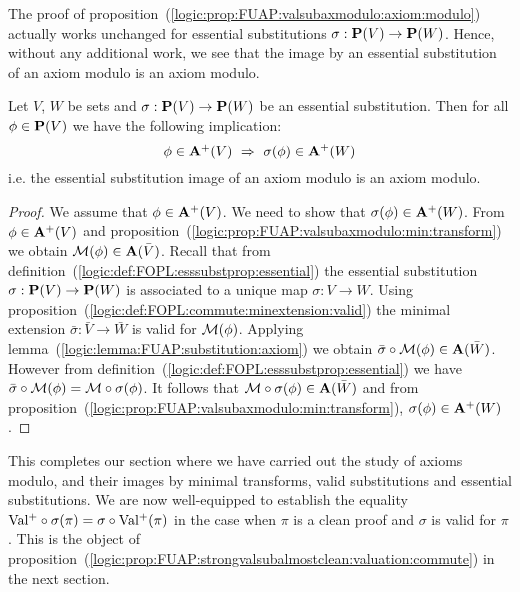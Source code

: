 The proof of
proposition~(\ref{logic:prop:FUAP:valsubaxmodulo:axiom:modulo})
actually works unchanged for essential substitutions
$\sigma:\mbox{${\bf P}(V)$}\to{\bf P}(W)$. Hence, without any additional work, we
see that the image by an essential substitution of an axiom modulo
is an axiom modulo.

\begin{prop}\label{logic:prop:FUAP:valsubaxmodulo:essential}
Let $V$, $W$ be sets and $\sigma:\mbox{${\bf P}(V)$}\to{\bf P}(W)$ be an essential
substitution. Then for all $\phi\in\mbox{${\bf P}(V)$}$ we have the following
implication:
    \[
    \phi\in\avs\ \Rightarrow\ \sigma(\phi)\in{\bf A}^{+}(W)
    \]
i.e. the essential substitution image of an axiom modulo is an axiom
modulo.
\end{prop}
\begin{proof}
We assume that $\phi\in\mbox{${\bf A}^{+}(V)$}$. We need to show that
$\sigma(\phi)\in{\bf A}^{+}(W)$. From $\phi\in\mbox{${\bf A}^{+}(V)$}$ and
proposition~(\ref{logic:prop:FUAP:valsubaxmodulo:min:transform}) we
obtain ${\cal M}(\phi)\in{\bf A}(\bar{V})$. Recall that from
definition~(\ref{logic:def:FOPL:esssubstprop:essential}) the
essential substitution $\sigma:\mbox{${\bf P}(V)$}\to{\bf P}(W)$ is associated to a
unique map $\sigma:V\to W$. Using
proposition~(\ref{logic:def:FOPL:commute:minextension:valid}) the
minimal extension ${\bar \sigma}:\bar{V}\to\bar{W}$ is valid for
${\cal M}(\phi)$. Applying
lemma~(\ref{logic:lemma:FUAP:substitution:axiom}) we obtain
$\bar{\sigma}\circ{\cal M}(\phi)\in{\bf A}(\bar{W})$. However from
definition~(\ref{logic:def:FOPL:esssubstprop:essential}) we have
$\bar{\sigma}\circ{\cal M}(\phi)={\cal M}\circ\sigma(\phi)$. It
follows that ${\cal M}\circ\sigma(\phi)\in{\bf A}(\bar{W})$ and from
proposition~(\ref{logic:prop:FUAP:valsubaxmodulo:min:transform}),
$\sigma(\phi)\in{\bf A}^{+}(W)$.
\end{proof}

This completes our section where we have carried out the study of
axioms modulo, and their images by minimal transforms, valid
substitutions and essential substitutions. We are now well-equipped
to establish the equality
$\mbox{$\rm Val^{+}$}\circ\sigma(\pi)=\sigma\circ\mbox{$\rm Val^{+}$}(\pi)$ in the case when $\pi$
is a clean proof and $\sigma$ is valid for $\pi$. This is the object
of
proposition~(\ref{logic:prop:FUAP:strongvalsubalmostclean:valuation:commute})
in the next section.
